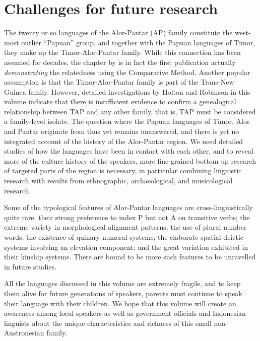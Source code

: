 \section{Challenges for future research}\label{sec:1:7}

The twenty or so languages of the Alor-Pantar (AP) family constitute the west-most outlier ``Papuan'' group, and together with the Papuan languages of Timor, they make up the Timor-Alor-Pantar family. While this connection has been assumed for decades, the chapter by \citet{SchapperEtAlTVtimor} is in fact the first publication actually \textit{demonstrating} the relatedness using the Comparative Method. Another popular assumption is that the Timor-Alor-Pantar family is part of the Trans-New Guinea family. However, detailed investigations by Holton and Robinson in this volume indicate that there is insufficient evidence to confirm a genealogical relationship between TAP and any other family, that is, TAP must be considered a family-level isolate. The question where the Papuan languages of Timor, Alor and Pantar originate from thus yet remains unanswered, and there is yet no integrated account of the history of the Alor-Pantar region. We need detailed studies of how the languages have been in contact with each other, and to reveal more of the culture history of the speakers, more fine-grained bottom up research of targeted parts of the region is necessary, in particular combining linguistic research with results from ethnographic, archaeological, and musicological research. 

Some of the typological features of Alor-Pantar languages are cross-linguis\-tically quite rare: their strong preference to index P but not A on transitive verbs; the extreme variety in morphological alignment patterns; the use of plural number words; the existence of quinary numeral systems; the elaborate spatial deictic systems involving an elevation component; and the great variation exhibited in their kinship systems. There are bound to be more such features to be unravelled in future studies.

All the languages discussed in this volume are extremely fragile, and to keep them alive for future generations of speakers, parents must continue to speak their language with their children. We hope that this volume will create an awareness among local speakers as well as government officials and Indonesian linguists about the unique characteristics and richness of this small non-Austronesian family.

